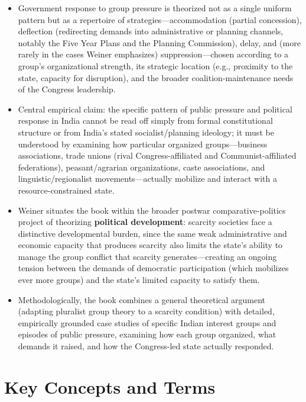 \documentclass[12pt]{article}
\begin{document}
\begin{itemize}[leftmargin=*, itemsep=4pt]
    \item Government response to group pressure is theorized not as a single uniform pattern but as a repertoire of strategies---accommodation (partial concession), deflection (redirecting demands into administrative or planning channels, notably the Five Year Plans and the Planning Commission), delay, and (more rarely in the cases Weiner emphasizes) suppression---chosen according to a group's organizational strength, its strategic location (e.g., proximity to the state, capacity for disruption), and the broader coalition-maintenance needs of the Congress leadership.
    \item Central empirical claim: the specific pattern of public pressure and political response in India cannot be read off simply from formal constitutional structure or from India's stated socialist/planning ideology; it must be understood by examining how particular organized groups---business associations, trade unions (rival Congress-affiliated and Communist-affiliated federations), peasant/agrarian organizations, caste associations, and linguistic/regionalist movements---actually mobilize and interact with a resource-constrained state.
    \item Weiner situates the book within the broader postwar comparative-politics project of theorizing \textbf{political development}: scarcity societies face a distinctive developmental burden, since the same weak administrative and economic capacity that produces scarcity also limits the state's ability to manage the group conflict that scarcity generates---creating an ongoing tension between the demands of democratic participation (which mobilizes ever more groups) and the state's limited capacity to satisfy them.
    \item Methodologically, the book combines a general theoretical argument (adapting pluralist group theory to a scarcity condition) with detailed, empirically grounded case studies of specific Indian interest groups and episodes of public pressure, examining how each group organized, what demands it raised, and how the Congress-led state actually responded.
\end{itemize}

\section{Key Concepts and Terms}
\end{document}
